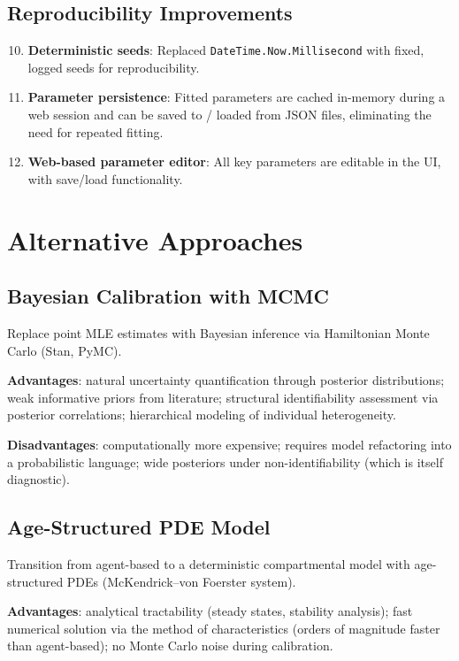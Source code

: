 \documentclass[12pt,a4paper]{article}
\begin{document}
\subsection{Reproducibility Improvements}

\begin{enumerate}[nosep]
    \setcounter{enumi}{9}
    \item \textbf{Deterministic seeds}: Replaced \texttt{DateTime.Now.Millisecond} with fixed, logged seeds for reproducibility.
    \item \textbf{Parameter persistence}: Fitted parameters are cached in-memory during a web session and can be saved to / loaded from JSON files, eliminating the need for repeated fitting.
    \item \textbf{Web-based parameter editor}: All key parameters are editable in the UI, with save/load functionality.
\end{enumerate}

\section{Alternative Approaches}

\subsection{Bayesian Calibration with MCMC}

Replace point MLE estimates with Bayesian inference via Hamiltonian Monte Carlo (Stan, PyMC).

\textbf{Advantages}: natural uncertainty quantification through posterior distributions; weak informative priors from literature; structural identifiability assessment via posterior correlations; hierarchical modeling of individual heterogeneity.

\textbf{Disadvantages}: computationally more expensive; requires model refactoring into a probabilistic language; wide posteriors under non-identifiability (which is itself diagnostic).

\subsection{Age-Structured PDE Model}

Transition from agent-based to a deterministic compartmental model with age-structured PDEs (McKendrick--von Foerster system).

\textbf{Advantages}: analytical tractability (steady states, stability analysis); fast numerical solution via the method of characteristics (orders of magnitude faster than agent-based); no Monte Carlo noise during calibration.
\end{document}
